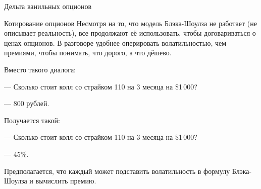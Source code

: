 \documentclass{beamer}
\begin{document}
\begin{frame}{Дельта ванильных опционов}
\centering
{}
\end{frame}



\begin{frame}{Котирование опционов}
\justify
Несмотря на то, что модель Блэка-Шоулза не работает (не описывает реальность), все продолжают её использовать, чтобы договариваться о ценах опционов. В разговоре удобнее оперировать волатильностью, чем премиями, чтобы понимать, что дорого, а что дёшево.

\justify
Вместо такого диалога:

--- Сколько стоит колл со страйком 110 на 3 месяца на \$1\,000?

--- 800 рублей.

\justify
Получается такой:

--- Сколько стоит колл со страйком 110 на 3 месяца на \$1\,000?

--- 45\%.

\justify
Предполагается, что каждый может подставить волатильность в формулу Блэка-Шоулза и вычислить премию.
\end{frame}
\end{document}
